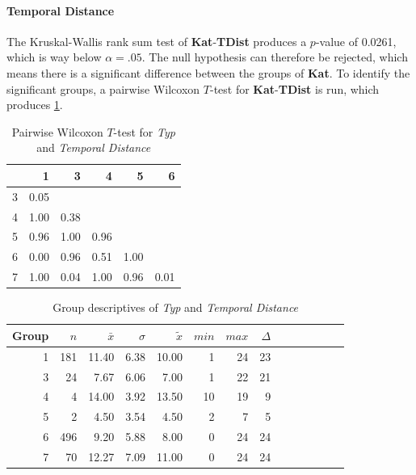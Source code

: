 \paragraph{Temporal Distance}
The Kruskal-Wallis rank sum test of \textbf{Kat}-\textbf{TDist} produces a $p$-value of 0.0261, which is way below $\alpha=.05$. The null hypothesis can therefore be rejected, which means there is a significant difference between the groups of \textbf{Kat}. To identify the significant groups, a pairwise Wilcoxon $T$-test for \textbf{Kat}-\textbf{TDist} is run, which produces \cref{tbl:wilcoxon_baysis_initiator_Typ_TDist}. 
\begin{table}[ht]
	\small
	\centering
    \begin{tabular}{rrrrrr}
        \toprule
        & 1 & 3 & 4 & 5 & 6 \\ 
        \midrule
        3 & 0.05 &  &  &  &  \\ 
        4 & 1.00 & 0.38 &  &  &  \\ 
        5 & 0.96 & 1.00 & 0.96 &  &  \\ 
        6 & 0.00 & 0.96 & 0.51 & 1.00 &  \\ 
        7 & 1.00 & 0.04 & 1.00 & 0.96 & 0.01 \\ 
        \bottomrule
    \end{tabular}
    \caption{Pairwise Wilcoxon $T$-test for \textit{Typ} and \textit{Temporal Distance}}
    \label{tbl:wilcoxon_baysis_initiator_Typ_TDist}
\end{table}
\begin{table}[ht]
	\small
	\centering
    \begin{tabular}{rrrrrrrrrrrrrr}
        \toprule
        Group & $n$ & $\bar{x}$ & $\sigma$ & $\tilde{x}$ & $min$ & $max$ & $\Delta$ \\
        \midrule
        1 & 181 & 11.40 & 6.38 & 10.00 & 1  & 24 & 23 \\ 
        3 & 24  & 7.67  & 6.06 & 7.00  & 1  & 22 & 21 \\ 
        4 & 4   & 14.00 & 3.92 & 13.50 & 10 & 19 & 9 \\ 
        5 & 2   & 4.50  & 3.54 & 4.50  & 2  & 7  & 5 \\ 
        6 & 496 & 9.20  & 5.88 & 8.00  & 0  & 24 & 24 \\ 
        7 & 70  & 12.27 & 7.09 & 11.00 & 0  & 24 & 24 \\ 
        \bottomrule
    \end{tabular}
    \caption{Group descriptives of \textit{Typ} and \textit{Temporal Distance}}
    \label{tbl:descriptives_baysis_initiator_Typ_TDist}
\end{table}

